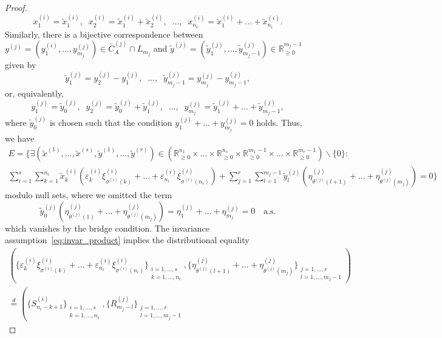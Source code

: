 \documentclass[12pt, reqno]{amsart}
\theoremstyle{plain}
\theoremstyle{definition}
\theoremstyle{remark}
\begin{document}
\begin{proof}
$$
x_1^{(i)}=\tilde{x}_1^{(i)}, \;\; x_2^{(i)}=\tilde{x}_1^{(i)}+\tilde{x}_2^{(i)},\;\; \ldots, \;\;  x_{n_i}^{(i)}= \tilde{x}_{1}^{(i)}+\ldots+\tilde{x}_{n_i}^{(i)}.
$$
Similarly, there is a bijective correspondence between $y^{(j)}= (y_1^{(i)},\ldots,y_{m_j}^{(j)})\in \bar C_A^{(j)}\cap L_{m_j}$ and $\tilde{y}^{(j)} = (\tilde{y}_1^{(j)},\ldots,\tilde{y}_{m_j-1}^{(j)})\in {\mathbb{R}}_{\geq 0}^{m_j-1}$ given by
$$
\tilde{y}_1^{(j)}=y_2^{(j)}-y_1^{(j)},\;\; \ldots, \;\; \tilde{y}_{m_j-1}^{(j)}=y_{m_j}^{(j)}-y_{m_j-1}^{(j)},
$$
or, equivalently,
$$
y_1^{(j)}=\tilde{y}_0^{(j)}, \;\; y_2^{(j)}=\tilde{y}_0^{(j)}+\tilde{y}_1^{(j)},\;\; \ldots, \;\;  y_{m_j}^{(j)}= \tilde{y}_{1}^{(j)}+\ldots+\tilde{y}_{m_j-1}^{(j)},
$$
where $\tilde{y}_0^{(j)}$ is chosen such that the condition $y_1^{(j)}+\ldots+y_{m_j}^{(j)}=0$ holds.
Thus, we have
\begin{multline*}
E = \Big\{\exists (\tilde{x}^{(1)},\ldots, \tilde{x}^{(s)},\tilde{y}^{(1)},\ldots, \tilde{y}^{(r)}) \in
({\mathbb{R}}_{\geq 0}^{n_1}\times \ldots \times {\mathbb{R}}_{\geq 0}^{n_s}\times {\mathbb{R}}_{\geq 0}^{m_1-1}\times \ldots \times {\mathbb{R}}_{\geq 0}^{m_r-1}){\backslash} \{0\}
\colon\\
\sum_{i=1}^{s} \sum_{k=1}^{n_i} \tilde{x}_k^{(i)} \left({\varepsilon}_k^{(i)} \xi^{(i)}_{\sigma^{(i)}(k)} + \ldots + {\varepsilon}_{n_i}^{(i)} \xi^{(i)}_{\sigma^{(i)}(n_i)}\right)
+\sum_{j=1}^{r} \sum_{l=1}^{m_j-1} \tilde{y}_l^{(j)} \left( \eta^{(j)}_{\theta^{(j)}(l+1)} + \ldots +  \eta^{(j)}_{\theta^{(j)}(m_j)}\right)
 = 0\Big\}
\end{multline*}
modulo null sets, where we omitted the term
$$
\tilde{y}_0^{(j)} \left(\eta^{(j)}_{\theta^{(j)}(1)} + \ldots +  \eta^{(j)}_{\theta^{(j)}(m_j)}\right)
=
\eta_1^{(j)}+ \ldots+ \eta_{m_j}^{(j)}=0
\quad
\text{a.s.}
$$
which vanishes by the bridge condition.
The invariance assumption~\eqref{eq:invar_product} implies the distributional equality
\begin{multline}
\left(\Big\{{\varepsilon}_k^{(i)} \xi^{(i)}_{\sigma^{(i)}(k)} + \ldots + {\varepsilon}_{n_i}^{(i)}
\xi^{(i)}_{\sigma^{(i)}(n_i)}\Big\}_{\substack{i=1,\ldots,s\\k=1,\ldots, n_i}},
\Big\{\eta^{(j)}_{\theta^{(j)}(l+1)} + \ldots +  \eta^{(j)}_{\theta^{(j)}(m_j)}\Big\}_{\substack{j=1,\ldots,r\\l=1,\ldots, m_j-1}}
\right)
\\
{\stackrel{d}{=}}
\left(
\Big\{S_{n_i-k+1}^{(i)}\Big\}_{\substack{i=1,\ldots,s\\k=1,\ldots, n_i}},
\Big\{R_{m_j-l}^{(j)}\Big\}_{\substack{j=1,\ldots,r\\l=1,\ldots, m_j-1}}

\end{multline}
\end{proof}
\end{document}
